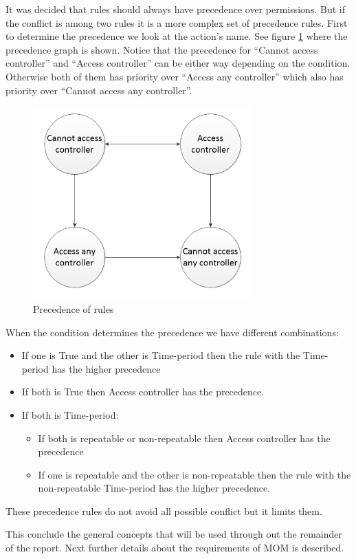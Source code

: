 It was decided that rules should always have precedence over permissions. But if the conflict is among two rules it is a more complex set of precedence rules. First to determine the precedence we look at the action's name. See figure \ref{fig:precendence} where the precedence graph is shown. Notice that the precedence for ``Cannot access controller'' and ``Access controller'' can be either way depending on the condition. Otherwise both of them has priority over ``Access any controller'' which also has priority over ``Cannot access any controller''. 
  
\begin{figure}
	\centering
		\includegraphics[width=0.75\textwidth]{images/precendence.jpg}
	\caption{Precedence of rules}
	\label{fig:precendence}
\end{figure}

When the condition determines the precedence we have different combinations:

\begin{itemize}
	\item If one is True and the other is Time-period then the rule with the Time-period has the higher precedence
	\item If both is True then Access controller has the precedence.
	\item If both is Time-period:
		\begin{itemize}
			\item If both is repeatable or non-repeatable%
			then Access controller has the precedence
			\item If one is repeatable and the other is non-repeatable then the rule with the non-repeatable Time-period has the higher precedence.
		\end{itemize}
\end{itemize}

These precedence rules do not avoid all possible conflict but it limits them.  


This conclude the general concepts that will be used through out the remainder of the report. Next further details about the requirements of MOM is described.